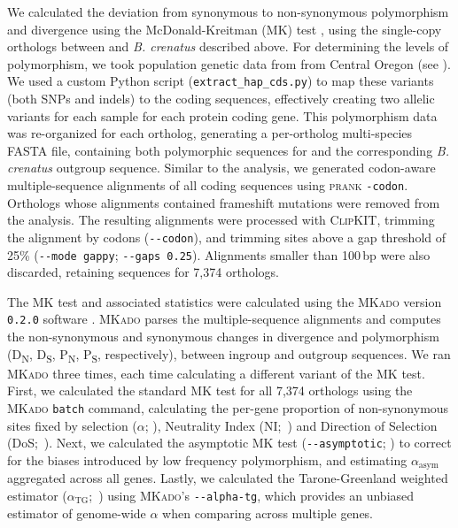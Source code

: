We calculated the deviation from synonymous to non-synonymous polymorphism and
divergence using the McDonald-Kreitman (MK) test \citep{mcdonald_adaptive_1991},
using the single-copy orthologs between \bgla{} and \textit{B. crenatus} described
above.
For determining the levels of polymorphism, we took population genetic data from
\bgla{} from Central Oregon (see ).
We used a custom Python script (\texttt{extract\_hap\_cds.py}) to map these
variants (both SNPs and indels) to the \bgla{} coding sequences, effectively
creating two allelic variants for each sample for each protein coding gene.
This polymorphism data was re-organized for each ortholog, generating a
per-ortholog multi-species FASTA file, containing both polymorphic sequences for
\bgla{} and the corresponding \textit{B. crenatus} outgroup sequence.
Similar to the \dnds{} analysis, we generated codon-aware multiple-sequence
alignments of all coding sequences using \textsc{prank} \texttt{-codon}.
Orthologs whose alignments contained frameshift mutations were removed from the
analysis.
The resulting alignments were processed with \textsc{ClipKIT}, trimming the
alignment by codons (\texttt{-{}-codon}), and trimming sites above a gap threshold
of 25\% (\texttt{-{}-mode gappy}; \texttt{-{}-gaps 0.25}).
Alignments smaller than 100\,bp were also discarded, retaining sequences for 7{,}374 
orthologs.
\vspace{0.1cm}

The MK test and associated statistics were calculated using the \textsc{MKado}
version \texttt{0.2.0} software \citep{mkado_2026}.
\textsc{MKado} parses the multiple-sequence alignments and computes the 
non-synonymous and synonymous changes in divergence and polymorphism
(D\textsubscript{N}, D\textsubscript{S}, P\textsubscript{N}, P\textsubscript{S},
respectively), between ingroup and outgroup sequences.
We ran \textsc{MKado} three times, each time calculating a different variant of
the MK test.
First, we calculated the standard MK test \citep{mcdonald_adaptive_1991} for all
7{,}374 orthologs using the \textsc{MKado} \texttt{batch} command, calculating the
per-gene proportion of non-synonymous sites fixed by selection ($\alpha$;
\citealp{smith_adaptive_2002}), Neutrality Index (NI;~\citealp{rand_excess_1996})
and Direction of Selection (DoS;~\citealp{stoletzki_estimation_2011}).
Next, we calculated the asymptotic MK test (\texttt{-{}-asymptotic};
\citealp{messer_frequent_2013}) to correct for the biases introduced by low
frequency polymorphism, and estimating $\alpha_\text{asym}$ aggregated across
all genes.
Lastly, we calculated the Tarone-Greenland weighted estimator
($\alpha_\text{TG}$;~\citealp{stoletzki_estimation_2011}) using
\textsc{MKado}'s \texttt{-{}-alpha-tg}, which provides an unbiased estimator of
genome-wide $\alpha$ when comparing across multiple genes.

